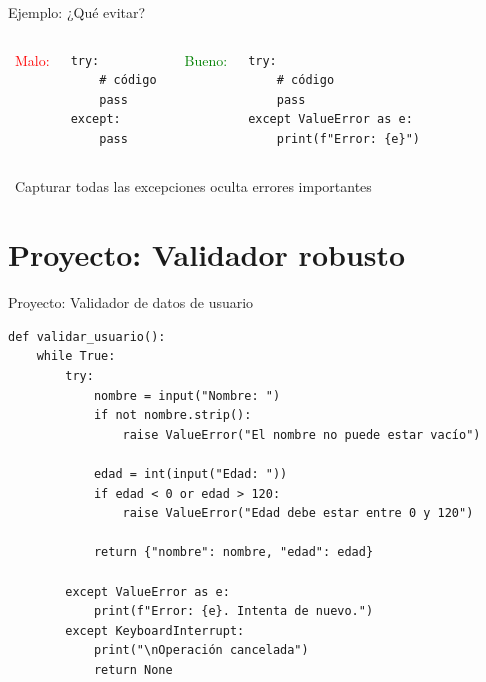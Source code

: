 \documentclass{beamer}
\begin{document}
\begin{frame}[fragile]{Ejemplo: ¿Qué evitar? \faTimesCircle}
\begin{columns}[T]
\textcolor{red}{\faTimesCircle\ Malo:}
\begin{lstlisting}
try:
    # código
    pass
except:
    pass
\end{lstlisting}

\textcolor{green}{\faCheckCircle\ Bueno:}
\begin{lstlisting}
try:
    # código
    pass
except ValueError as e:
    print(f"Error: {e}")
\end{lstlisting}
\end{columns}

\vspace{0.3cm}
\begin{notebox}
\small\faExclamationTriangle\ Capturar todas las excepciones oculta errores importantes
\end{notebox}
\end{frame}

\section{Proyecto: Validador robusto}

\begin{frame}[fragile]{Proyecto: Validador de datos de usuario \faUserCog}
\begin{lstlisting}
def validar_usuario():
    while True:
        try:
            nombre = input("Nombre: ")
            if not nombre.strip():
                raise ValueError("El nombre no puede estar vacío")
            
            edad = int(input("Edad: "))
            if edad < 0 or edad > 120:
                raise ValueError("Edad debe estar entre 0 y 120")
            
            return {"nombre": nombre, "edad": edad}
        
        except ValueError as e:
            print(f"Error: {e}. Intenta de nuevo.")
        except KeyboardInterrupt:
            print("\nOperación cancelada")
            return None
\end{lstlisting}
\end{frame}
\end{document}
